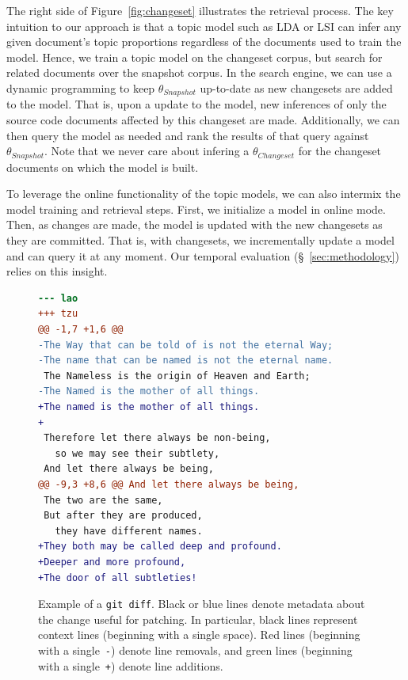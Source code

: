 The right side of Figure~\ref{fig:changeset} illustrates the retrieval process.
The key intuition to our approach is that a topic model such as LDA or LSI
can infer any given document's topic proportions regardless of the documents used to train the model.
Hence, we train a topic model on the changeset corpus,
but search for related documents over the snapshot corpus.
In the search engine, we can use a dynamic programming to
keep $\theta_{Snapshot}$ up-to-date as new changesets are added to the model.
That is, upon a update to the model, new inferences of only the source code documents affected by this changeset are made.
Additionally, we can then query the model as needed
and rank the results of that query against $\theta_{Snapshot}$.
Note that we never care about infering a $\theta_{Changeset}$
for the changeset documents on which the model is built.

To leverage the online functionality of the topic models,
we can also intermix the model training and retrieval steps.
First, we initialize a model in online mode.
Then, as changes are made, the model is updated with the new changesets as they are committed.
That is, with changesets, we incrementally update a model and can query it at any moment.
Our temporal evaluation (\S~\ref{sec:methodology}) relies on this insight.



\begin{figure}[t]
\centering
\footnotesize
\begin{lstlisting}[language=diff, basicstyle=\ttfamily]
--- lao
+++ tzu
@@ -1,7 +1,6 @@
-The Way that can be told of is not the eternal Way;
-The name that can be named is not the eternal name.
 The Nameless is the origin of Heaven and Earth;
-The Named is the mother of all things.
+The named is the mother of all things.
+
 Therefore let there always be non-being,
   so we may see their subtlety,
 And let there always be being,
@@ -9,3 +8,6 @@ And let there always be being,
 The two are the same,
 But after they are produced,
   they have different names.
+They both may be called deep and profound.
+Deeper and more profound,
+The door of all subtleties!
\end{lstlisting}
\caption{Example of a \texttt{git diff}.
Black or blue lines denote metadata about the change useful for patching.
In particular, black lines represent context lines (beginning with a single space).
Red lines (beginning with a single~\texttt{-}) denote line removals,
and green lines (beginning with a single~\texttt{+}) denote line additions.}
\label{fig:diff}
\vspace{-10pt}
\end{figure}
